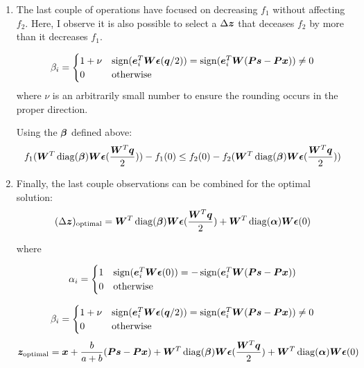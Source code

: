 \documentclass{article}
\begin{document}
\begin{enumerate}
\item
The last couple of operations have focused on decreasing $f_1$ without affecting $f_2$. Here, I observe it is also possible to select a $\Delta\bm{z}$ that deceases $f_2$ by more than it decreases $f_1$.

\begin{equation}
\beta_i = \begin{cases} 1 + \nu  & \operatorname{sign}(\bm{e}_i^T\bm{W}\bm{\epsilon}(\bm{q}/2)) = \operatorname{sign}(\bm{e}_i^T\bm{W}(\bm{P}\bm{s} - \bm{P}\bm{x})) \neq 0 \\
                         0 & \text{otherwise}
           \end{cases}
\end{equation}
where $\nu$ is an arbitrarily small number to ensure the rounding occurs in the proper direction.

Using the $\bm{\beta}$ defined above:
\begin{equation}
f_1(\bm{W}^T\operatorname{diag}(\bm{\beta})\bm{W}\bm{\epsilon}(\frac{\bm{W}^T\bm{q}}{2})) - f_1(0) \leq f_2(0) - f_2(\bm{W}^T\operatorname{diag}(\bm{\beta})\bm{W}\bm{\epsilon}(\frac{\bm{W}^T\bm{q}}{2}))
\end{equation}

\item
Finally, the last couple observations can be combined for the optimal solution:
\begin{equation}
(\Delta\bm{z})_{\text{optimal}} = \bm{W}^T\operatorname{diag}(\bm{\beta})\bm{W}\bm{\epsilon}(\frac{\bm{W}^T\bm{q}}{2}) + \bm{W}^T\operatorname{diag}(\bm{\alpha})\bm{W}\bm{\epsilon}(0)
\end{equation}

where

\begin{equation}
\alpha_i = \begin{cases} 1 & \operatorname{sign}(\bm{e}_i^T\bm{W}\bm{\epsilon}(0)) = -\operatorname{sign}(\bm{e}_i^T\bm{W}(\bm{P}\bm{s} - \bm{P}\bm{x})) \\
                         0 & \text{otherwise}
           \end{cases}
\end{equation}

\begin{equation}
\beta_i = \begin{cases} 1 + \nu  & \operatorname{sign}(\bm{e}_i^T\bm{W}\bm{\epsilon}(\bm{q}/2)) = \operatorname{sign}(\bm{e}_i^T\bm{W}(\bm{P}\bm{s} - \bm{P}\bm{x})) \neq 0 \\
                        0 & \text{otherwise}
          \end{cases}
\end{equation}
\begin{equation}
\bm{z}_{\text{optimal}} = \bm{x} + \frac{b}{a + b}(\bm{P}\bm{s} - \bm{P}\bm{x}) + \bm{W}^T\operatorname{diag}(\bm{\beta})\bm{W}\bm{\epsilon}(\frac{\bm{W}^T\bm{q}}{2}) + \bm{W}^T\operatorname{diag}(\bm{\alpha})\bm{W}\bm{\epsilon}(0)
\end{equation}

\end{enumerate}
\end{document}
